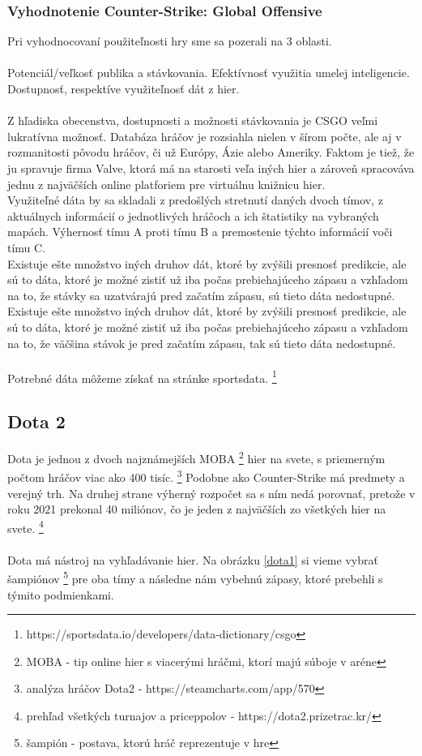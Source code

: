  

 \subsubsection{Vyhodnotenie Counter-Strike: Global Offensive}
 Pri vyhodnocovaní použiteľnosti hry sme sa pozerali na 3 oblasti. \\ \\ Potenciál/veľkosť publika a stávkovania. Efektívnosť využitia umelej inteligencie. Dostupnosť, respektíve využiteľnosť dát z hier. \\ \\
 Z hľadiska obecenstva, dostupnosti a možnosti stávkovania je CSGO veľmi lukratívna možnosť. Databáza hráčov je rozsiahla nielen v šírom počte, ale aj v rozmanitosti pôvodu hráčov, či už Európy, Ázie alebo Ameriky. Faktom je tiež, že ju spravuje firma Valve, ktorá má na starosti veľa iných hier a zároveň spracováva jednu z najväčších online platforiem pre virtuálnu knižnicu hier. \\
 Využiteľné dáta by sa skladali z predošlých stretnutí daných dvoch tímov, z aktuálnych informácií o jednotlivých hráčoch a ich štatistiky na vybraných mapách. Výhernosť tímu A proti tímu B a premostenie týchto informácií voči tímu C.\\
 Existuje ešte množstvo iných druhov dát, ktoré by zvýšili presnosť predikcie, ale sú to dáta, ktoré je možné zistiť už iba počas prebiehajúceho zápasu a vzhľadom na to, že stávky sa uzatvárajú pred začatím zápasu, sú tieto dáta nedostupné.
  Existuje ešte množstvo iných druhov dát, ktoré by zvýšili presnosť predikcie, ale sú to dáta, ktoré je možné zistiť už iba počas prebiehajúceho zápasu a vzhľadom na to, že väčšina stávok je pred začatím zápasu, tak sú tieto dáta nedostupné.
 \\ \\
 Potrebné dáta môžeme získať na stránke sportsdata. \footnote {
 https://sportsdata.io/developers/data-dictionary/csgo
}


\subsection{Dota 2}
Dota je jednou z dvoch najznámejších MOBA \footnote {
	MOBA - tip online hier s viacerými hráčmi, ktorí majú súboje v aréne
} hier na svete, s priemerným počtom hráčov viac ako 400 tisíc. \footnote{analýza hráčov Dota2 - https://steamcharts.com/app/570} Podobne ako Counter-Strike má predmety a verejný trh. Na druhej strane výherný rozpočet sa s ním nedá porovnať, pretože v roku 2021 prekonal 40 miliónov, čo je jeden z najväčších zo všetkých hier na svete. \footnote{prehľad všetkých turnajov a priceppolov - https://dota2.prizetrac.kr/}
\\ \\
Dota má nástroj na vyhľadávanie hier. Na obrázku \ref{dota1} si vieme vybrať šampiónov \footnote {
	šampión - postava, ktorú hráč reprezentuje v hre
} pre oba tímy a následne nám vybehnú zápasy, ktoré prebehli s týmito podmienkami.

